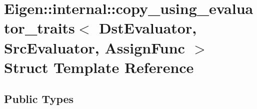 \hypertarget{struct_eigen_1_1internal_1_1copy__using__evaluator__traits}{}\section{Eigen\+:\+:internal\+:\+:copy\+\_\+using\+\_\+evaluator\+\_\+traits$<$ Dst\+Evaluator, Src\+Evaluator, Assign\+Func $>$ Struct Template Reference}
\label{struct_eigen_1_1internal_1_1copy__using__evaluator__traits}
\subsection*{Public Types}
